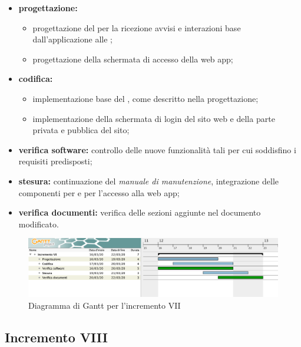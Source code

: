 					\begin{itemize}
						\item \textbf{progettazione:} 
						\begin{itemize}
							\item progettazione del  per la ricezione avvisi e interazioni base dall'applicazione alle ; 
							\item progettazione della schermata di accesso della web app;
						\end{itemize}
						\item \textbf{codifica:} 
						\begin{itemize}
							\item implementazione base del , come descritto nella progettazione; 
							\item implementazione della schermata di login del sito web e della parte privata e pubblica del sito;
						\end{itemize}
						\item \textbf{verifica software:} controllo delle nuove funzionalità tali per cui soddisfino i requisiti predisposti;
						\item \textbf{stesura:} continuazione del \textit{manuale di manutenzione}, integrazione delle componenti per  e per l'accesso alla web app;
						\item \textbf{verifica documenti:} verifica delle sezioni aggiunte nel documento modificato.
					\end{itemize} 			

		\begin{landscape}
          \begin{figure}[H]
            \centering
            \includegraphics[width=\linewidth]{images/gantt/incrementoVII} %
            \caption{Diagramma di Gantt per l'incremento VII}
          \end{figure}		
		\end{landscape}


		\subsection{Incremento VIII}
			
